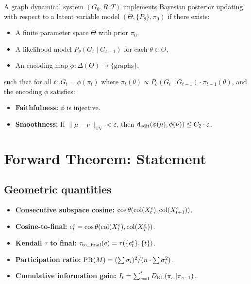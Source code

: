 \documentclass{../shared/primo}
\begin{document}
\begin{definition}\label{def:bayesian}
A graph dynamical system $(G_0, R, T)$ implements Bayesian posterior updating with respect to a latent variable model $(\Theta, \{P_\theta\}, \pi_0)$ if there exists:
\begin{itemize}
\item A finite parameter space $\Theta$ with prior $\pi_0$,
\item A likelihood model $P_\theta(G_t \mid G_{t-1})$ for each $\theta \in \Theta$,
\item An encoding map $\phi: \Delta(\Theta) \to \{\text{graphs}\}$,
\end{itemize}
such that for all $t$: $G_t = \phi(\pi_t)$ where $\pi_t(\theta) \propto P_\theta(G_t \mid G_{t-1}) \cdot \pi_{t-1}(\theta)$, and the encoding $\phi$ satisfies:
\begin{itemize}
\item \textbf{Faithfulness:} $\phi$ is injective.
\item \textbf{Smoothness:} If $\|\mu - \nu\|_{\mathrm{TV}} < \varepsilon$, then $\operatorname{d_{edit}}(\phi(\mu), \phi(\nu)) \leq C_2 \cdot \varepsilon$.
\end{itemize}
\end{definition}


\section{Forward Theorem: Statement}
\label{sec:statement}

\subsection{Geometric quantities}

\begin{itemize}
\item \textbf{Consecutive subspace cosine:} $\cos\theta(\operatorname{col}(X_t^e), \operatorname{col}(X_{t+1}^e))$.
\item \textbf{Cosine-to-final:} $c_t^e = \cos\theta(\operatorname{col}(X_t^e), \operatorname{col}(X_T^e))$.
\item \textbf{Kendall $\tau$ to final:} $\tau_{\mathrm{to\_final}}(e) = \tau(\{c_t^e\}, \{t\})$.
\item \textbf{Participation ratio:} $\operatorname{PR}(M) = (\sum \sigma_i)^2 / (n \cdot \sum \sigma_i^2)$.
\item \textbf{Cumulative information gain:} $I_t = \sum_{s=1}^{t} D_{\mathrm{KL}}(\pi_s \| \pi_{s-1})$.
\end{itemize}
\end{document}
